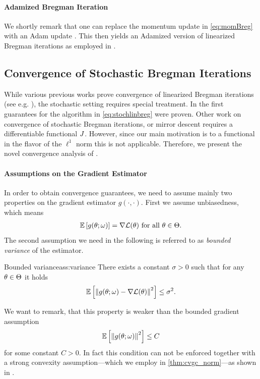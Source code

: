 \paragraph{Adamized Bregman Iteration} We shortly remark that one can replace the momentum update in \cref{eq:momBreg} with an Adam update \cite{kingma2014adam}. This then yields an Adamized version of linearized Bregman iterations as employed in \cite{bungert2022bregman}.


\subsection{Convergence of Stochastic Bregman Iterations}\label{sec:ConvAna}
%
%
While various previous works prove convergence of linearized Bregman iterations (see e.g. \cite{osher2005iterative, cai2009convergence}), the stochastic setting requires special treatment. In \cite{bungert2022bregman} the first guarantees for the algorithm in \cref{eq:stochlinbreg} were proven. Other work on convergence of stochastic Bregman iterations, or mirror descent \cite{dragomir2021fast, hanzely2021fastest, zhang2018convergence, d2021stochastic, aubin2022mirror} requires a differentiable functional $J$. However, since our main motivation is to a functional in the flavor of the $\ell^1$ norm this is not applicable. Therefore, we present the novel convergence analysis of \cite{bungert2022bregman}.
%
%
\paragraph{Assumptions on the Gradient Estimator}
%
In order to obtain convergence guarantees, we need to assume mainly two properties on the gradient estimator $g(\cdot,\cdot)$. First we assume unbiasedness, which means
%
\begin{align*}
\mathbb{E}\left[g(\theta;\omega)\right] = \nabla\mathcal{L}(\theta)\text{ for all }\theta\in\Theta.
\end{align*}
%
The second assumption we need in the following is referred to as \emph{bounded variance} of the estimator.
%
\begin{assumption}{Bounded variance}{ass:variance}
There exists a constant $\sigma>0$ such that for any $\theta\in\Theta$ it holds
\begin{align}
    \mathbb{E}\left[\left\|g(\theta;\omega)-\nabla\mathcal{L}(\theta)\right\|^2\right] \leq \sigma^2.
\end{align}
\end{assumption}
%
%
\begin{remark}{}{}
We want to remark, that this property is weaker than the bounded gradient assumption
%
\begin{align*}
\mathbb{E}\left[\left\|g(\theta;\omega)\right\|^2\right] \leq C
\end{align*}
%
for some constant $C>0$. In fact this condition can not be enforced together with a strong convexity assumption---which we employ in \cref{thm:cvgc_norm}---as shown in \cite{pmlr-v80-nguyen18c}.
\end{remark}
